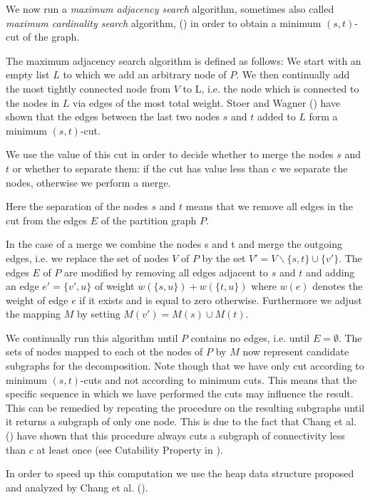 \documentclass[a4paper,xcolor=dvipsnames, tikz, 12pt]{article}
\theoremstyle{definition}
\begin{document}
We now run a \textit{maximum adjacency search} algorithm, sometimes also called \textit{maximum cardinality search} algorithm, (\cite{Stoer1997}) in order to obtain a minimum $(s,t)$-cut of the graph.

The maximum adjacency search algorithm is defined as follows: We start with an empty list $L$ to which we add an arbitrary node of $P$. We then continually add the most tightly connected node from $V$ to L, i.e. the node which is connected to the nodes in $L$ via edges of the most total weight. Stoer and Wagner (\cite{Stoer1997}) have shown that the edges between the last two nodes $s$ and $t$ added to $L$ form a minimum $(s,t)$-cut.

We use the value of this cut in order to decide whether to merge the nodes $s$ and $t$ or whether to separate them: if the cut has value less than $c$ we separate the nodes, otherwise we perform a merge.

Here the separation of the nodes $s$ and $t$ means that we remove all edges in the cut from the edges $E$ of the partition graph $P$.

In the case of a merge we combine the nodes s and t and merge the outgoing edges, i.e. we replace the set of nodes $V$ of $P$ by the set $V'=V\backslash\{s,t\}\cup\{v'\}$. The edges $E$ of $P$ are modified by removing all edges adjacent to $s$ and $t$ and adding an edge $e'=\{v',u\}$ of weight $w(\{s,u\})+w(\{t,u\})$ where $w(e)$ denotes the weight of edge $e$ if it exists and is equal to zero otherwise.
Furthermore we adjust the mapping $M$ by setting $M(v')=M(s)\cup M(t)$.

We continually run this algorithm until $P$ contains no edges, i.e. until $E=\emptyset$. The sets of nodes mapped to each ot the nodes of $P$ by $M$ now represent candidate subgraphs for the decomposition. Note though that we have only cut according to minimum $(s,t)$-cuts and not according to minimum cuts. This means that the specific sequence in which we have performed the cuts may influence the result. This can be remedied by repeating the procedure on the resulting subgraphs until it returns a subgraph of only one node. This is due to the fact that Chang et al. (\cite{Chang2013}) have shown that this procedure always cuts a subgraph of connectivity less than $c$ at least once (see Cutability Property in \cite{Chang2013}).

In order to speed up this computation we use the heap data structure proposed and analyzed by Chang et al. (\cite{Chang2013}).
\end{document}
